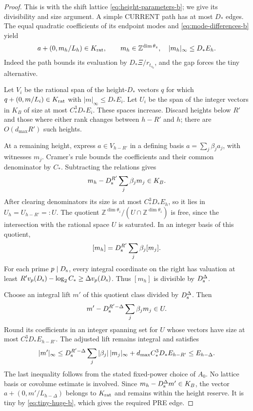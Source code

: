 \begin{proof}
This is \cite[Lemma~8.3]{H} with the shift lattice
\eqref{eq:height-parameters-b}; we give its divisibility and size
argument.  A simple CURRENT path has at most \(D_*\) edges.
The equal quadratic coefficients of its endpoint modes and
\eqref{eq:mode-differences-b} yield
\[
 a+(0,m_h/L_h)\in K_{\rm rat},\qquad
 m_h\in\mathbb Z^{\dim\theta_z},\quad |m_h|_\infty\le D_*E_h.
\]
Indeed the path bounds its evaluation by \(D_*\Xi/r_{t_{s_0}}\), and
the gap forces the tiny alternative.

Let \(V_i\) be the rational span of the height-\(D_*\) vectors
\(q\) for which \(q+(0,m/L_i)\in K_{\rm rat}\) with
\(|m|_\infty\le D_*E_i\).  Let \(U_i\) be the span of the
integer vectors in \(K_B\) of size at most \(C_*^3D_*E_i\).
These spaces increase.  Discard heights below \(R'\) and those
where either rank changes between \(h-R'\) and \(h\); there are
\(O(d_{\max}R')\) such heights.

At a remaining height, express \(a\in V_{h-R'}\) in a defining
basis \(a=\sum_j\beta_ja_j\), with witnesses \(m_j\).
Cramer's rule bounds the coefficients and their common denominator
by \(C_*\).  Subtracting the relations gives
\[
 m_h-D_{\rm s}^{R'}\sum_j\beta_jm_j\in K_B.
\]
After clearing denominators its size is at most \(C_*^3D_*E_h\),
so it lies in \(U_h=U_{h-R'}=:U\).
The quotient \(\mathbb Z^{\dim\theta_z}/(U\cap\mathbb Z^{\dim\theta_z})\)
is free, since the intersection with the rational space \(U\)
is saturated.  In an integer basis of this quotient,
\[
 [m_h]=D_{\rm s}^{R'}\sum_j\beta_j[m_j].
\]
For each prime \(p\mid D_{\rm s}\), every integral coordinate on
the right has valuation at least
\(R'v_p(D_{\rm s})-\log_2C_*\ge\Delta v_p(D_{\rm s})\).
Thus \([m_h]\) is divisible by \(D_{\rm s}^\Delta\).

Choose an integral lift \(m'\) of this quotient class divided by
\(D_{\rm s}^\Delta\).  Then
\[
 m'-D_{\rm s}^{R'-\Delta}\sum_j\beta_jm_j\in U.
\]
Round its coefficients in an integer spanning set for \(U\)
whose vectors have size at most \(C_*^3D_*E_{h-R'}\).  The adjusted
lift remains integral and satisfies
\[
 |m'|_\infty\le
 D_{\rm s}^{R'-\Delta}\sum_j|\beta_j|\,|m_j|_\infty
   +d_{\max}C_*^3D_*E_{h-R'}\le E_{h-\Delta}.
\]
The last inequality follows from the stated fixed-power choice of
\(A_0\).  No lattice basis or covolume estimate is involved.
Since \(m_h-D_{\rm s}^\Delta m'\in K_B\), the vector
\(a+(0,m'/L_{h-\Delta})\) belongs to \(K_{\rm rat}\) and remains
within the height reserve.  It is tiny by
\eqref{eq:tiny-huge-b}, which gives the required PRE edge.
\end{proof}

